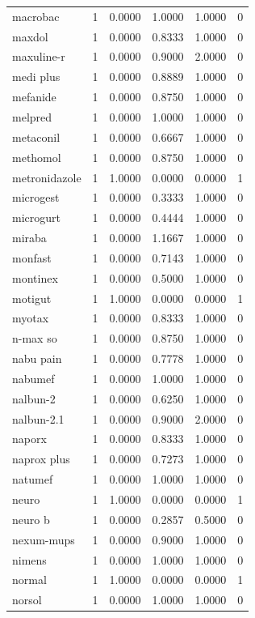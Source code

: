\begin{longtable}{p{3.0cm}rrrrr}
macrobac & 1 & 0.0000 & 1.0000 & 1.0000 & 0 \\
maxdol & 1 & 0.0000 & 0.8333 & 1.0000 & 0 \\
maxuline-r & 1 & 0.0000 & 0.9000 & 2.0000 & 0 \\
medi plus & 1 & 0.0000 & 0.8889 & 1.0000 & 0 \\
mefanide & 1 & 0.0000 & 0.8750 & 1.0000 & 0 \\
melpred & 1 & 0.0000 & 1.0000 & 1.0000 & 0 \\
metaconil & 1 & 0.0000 & 0.6667 & 1.0000 & 0 \\
methomol & 1 & 0.0000 & 0.8750 & 1.0000 & 0 \\
metronidazole & 1 & 1.0000 & 0.0000 & 0.0000 & 1 \\
microgest & 1 & 0.0000 & 0.3333 & 1.0000 & 0 \\
microgurt & 1 & 0.0000 & 0.4444 & 1.0000 & 0 \\
miraba & 1 & 0.0000 & 1.1667 & 1.0000 & 0 \\
monfast & 1 & 0.0000 & 0.7143 & 1.0000 & 0 \\
montinex & 1 & 0.0000 & 0.5000 & 1.0000 & 0 \\
motigut & 1 & 1.0000 & 0.0000 & 0.0000 & 1 \\
myotax & 1 & 0.0000 & 0.8333 & 1.0000 & 0 \\
n-max so & 1 & 0.0000 & 0.8750 & 1.0000 & 0 \\
nabu pain & 1 & 0.0000 & 0.7778 & 1.0000 & 0 \\
nabumef & 1 & 0.0000 & 1.0000 & 1.0000 & 0 \\
nalbun-2 & 1 & 0.0000 & 0.6250 & 1.0000 & 0 \\
nalbun-2.1 & 1 & 0.0000 & 0.9000 & 2.0000 & 0 \\
naporx & 1 & 0.0000 & 0.8333 & 1.0000 & 0 \\
naprox plus & 1 & 0.0000 & 0.7273 & 1.0000 & 0 \\
natumef & 1 & 0.0000 & 1.0000 & 1.0000 & 0 \\
neuro & 1 & 1.0000 & 0.0000 & 0.0000 & 1 \\
neuro b & 1 & 0.0000 & 0.2857 & 0.5000 & 0 \\
nexum-mups & 1 & 0.0000 & 0.9000 & 1.0000 & 0 \\
nimens & 1 & 0.0000 & 1.0000 & 1.0000 & 0 \\
normal & 1 & 1.0000 & 0.0000 & 0.0000 & 1 \\
norsol & 1 & 0.0000 & 1.0000 & 1.0000 & 0 \\

\end{longtable}
